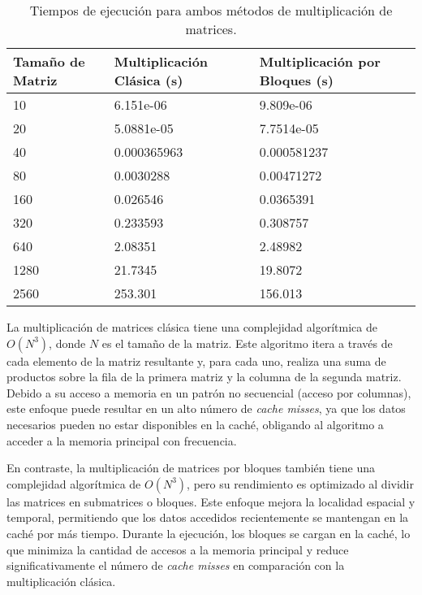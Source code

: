 \documentclass[conference]{IEEEtran}
\begin{document}
\begin{table}[h!]
\centering
\begin{tabularx}{250pt}{|X|X|X|}
\hline
\textbf{Tamaño de Matriz} & \textbf{Multiplicación Clásica (s)} & \textbf{Multiplicación por Bloques (s)} \\ \hline
10                        & 6.151e-06                          & 9.809e-06                             \\ \hline
20                        & 5.0881e-05                         & 7.7514e-05                            \\ \hline
40                        & 0.000365963                        & 0.000581237                           \\ \hline
80                        & 0.0030288                         & 0.00471272                            \\ \hline
160                       & 0.026546                           & 0.0365391                             \\ \hline
320                       & 0.233593                           & 0.308757                              \\ \hline
640                       & 2.08351                            & 2.48982                               \\ \hline
1280                      & 21.7345                            & 19.8072                               \\ \hline
2560                      & 253.301                            & 156.013                               \\ \hline
\end{tabularx}
\caption{Tiempos de ejecución para ambos métodos de multiplicación de matrices.}
\label{Tabla2}
\end{table}
La multiplicación de matrices clásica tiene una complejidad algorítmica de \(O(N^3)\), donde \(N\) es el tamaño de la matriz. Este algoritmo itera a través de cada elemento de la matriz resultante y, para cada uno, realiza una suma de productos sobre la fila de la primera matriz y la columna de la segunda matriz. Debido a su acceso a memoria en un patrón no secuencial (acceso por columnas), este enfoque puede resultar en un alto número de \textit{cache misses}, ya que los datos necesarios pueden no estar disponibles en la caché, obligando al algoritmo a acceder a la memoria principal con frecuencia.

En contraste, la multiplicación de matrices por bloques también tiene una complejidad algorítmica de \(O(N^3)\), pero su rendimiento es optimizado al dividir las matrices en submatrices o bloques. Este enfoque mejora la localidad espacial y temporal, permitiendo que los datos accedidos recientemente se mantengan en la caché por más tiempo. Durante la ejecución, los bloques se cargan en la caché, lo que minimiza la cantidad de accesos a la memoria principal y reduce significativamente el número de \textit{cache misses} en comparación con la multiplicación clásica.
\end{document}
